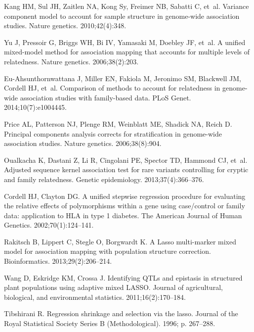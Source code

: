 \documentclass[10pt,letterpaper]{article}
\begin{document}
\begin{thebibliography}{10}
	Kang HM, Sul JH, Zaitlen NA, Kong Sy, Freimer NB, Sabatti C, et~al.
	\newblock Variance component model to account for sample structure in
	genome-wide association studies.
	\newblock Nature genetics. 2010;42(4):348.

	Yu J, Pressoir G, Briggs WH, Bi IV, Yamasaki M, Doebley JF, et~al.
	\newblock A unified mixed-model method for association mapping that accounts
	for multiple levels of relatedness.
	\newblock Nature genetics. 2006;38(2):203.

	Eu-Ahsunthornwattana J, Miller EN, Fakiola M, Jeronimo SM, Blackwell JM,
	Cordell HJ, et~al.
	\newblock Comparison of methods to account for relatedness in genome-wide
	association studies with family-based data.
	\newblock PLoS Genet. 2014;10(7):e1004445.

	Price AL, Patterson NJ, Plenge RM, Weinblatt ME, Shadick NA, Reich D.
	\newblock Principal components analysis corrects for stratification in
	genome-wide association studies.
	\newblock Nature genetics. 2006;38(8):904.

	Oualkacha K, Dastani Z, Li R, Cingolani PE, Spector TD, Hammond CJ, et~al.
	\newblock Adjusted sequence kernel association test for rare variants
	controlling for cryptic and family relatedness.
	\newblock Genetic epidemiology. 2013;37(4):366--376.

	Cordell HJ, Clayton DG.
	\newblock A unified stepwise regression procedure for evaluating the relative
	effects of polymorphisms within a gene using case/control or family data:
	application to HLA in type 1 diabetes.
	\newblock The American Journal of Human Genetics. 2002;70(1):124--141.

	Rakitsch B, Lippert C, Stegle O, Borgwardt K.
	\newblock A Lasso multi-marker mixed model for association mapping with
	population structure correction.
	\newblock Bioinformatics. 2013;29(2):206--214.

	Wang D, Eskridge KM, Crossa J.
	\newblock Identifying QTLs and epistasis in structured plant populations using
	adaptive mixed LASSO.
	\newblock Journal of agricultural, biological, and environmental statistics.
	2011;16(2):170--184.

	Tibshirani R.
	\newblock Regression shrinkage and selection via the lasso.
	\newblock Journal of the Royal Statistical Society Series B (Methodological).
	1996; p. 267--288.


\end{thebibliography}
\end{document}
